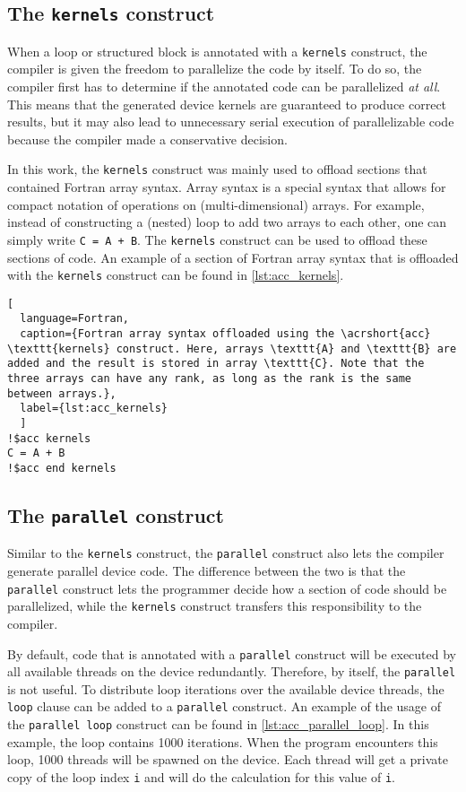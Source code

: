 \subsection{The \texttt{kernels} construct}
When a loop or structured block is annotated with a \texttt{kernels} construct, the compiler is given the freedom to parallelize the code by itself. To do so, the compiler first has to determine if the annotated code can be parallelized \emph{at all}. This means that the generated device kernels are guaranteed to produce correct results, but it may also lead to unnecessary serial execution of parallelizable code because the compiler made a conservative decision.

In this work, the \texttt{kernels} construct was mainly used to offload sections that contained Fortran array syntax. Array syntax is a special syntax that allows for compact notation of operations on (multi-dimensional) arrays. For example, instead of constructing a (nested) loop to add two arrays to each other, one can simply write \texttt{C = A + B}. The \texttt{kernels} construct can be used to offload these sections of code. An example of a section of Fortran array syntax that is offloaded with the \texttt{kernels} construct can be found in \autoref{lst:acc_kernels}.

\begin{lstlisting}[
  language=Fortran,
  caption={Fortran array syntax offloaded using the \acrshort{acc} \texttt{kernels} construct. Here, arrays \texttt{A} and \texttt{B} are added and the result is stored in array \texttt{C}. Note that the three arrays can have any rank, as long as the rank is the same between arrays.},
  label={lst:acc_kernels}
  ]
!$acc kernels
C = A + B
!$acc end kernels
\end{lstlisting}

\subsection{The \texttt{parallel} construct}
Similar to the \texttt{kernels} construct, the \texttt{parallel} construct also lets the compiler generate parallel device code. The difference between the two is that the \texttt{parallel} construct lets the programmer decide how a section of code should be parallelized, while the \texttt{kernels} construct transfers this responsibility to the compiler. 

By default, code that is annotated with a \texttt{parallel} construct will be executed by all available threads on the device redundantly. Therefore, by itself, the \texttt{parallel} is not useful. To distribute loop iterations over the available device threads, the \texttt{loop} clause can be added to a \texttt{parallel} construct. An example of the usage of the \texttt{parallel loop} construct can be found in \autoref{lst:acc_parallel_loop}. In this example, the loop contains 1000 iterations. When the program encounters this loop, 1000 threads will be spawned on the device. Each thread will get a private copy of the loop index \texttt{i} and will do the calculation for this value of \texttt{i}. 

